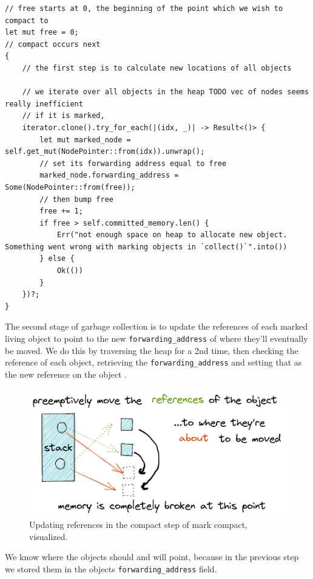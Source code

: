 \documentclass[index]{subfiles}
\begin{document}
\begin{verbatim}
// free starts at 0, the beginning of the point which we wish to compact to
let mut free = 0;
// compact occurs next
{
    // the first step is to calculate new locations of all objects

    // we iterate over all objects in the heap TODO vec of nodes seems really inefficient
    // if it is marked,
    iterator.clone().try_for_each(|(idx, _)| -> Result<()> {
        let mut marked_node = self.get_mut(NodePointer::from(idx)).unwrap();
        // set its forwarding address equal to free
        marked_node.forwarding_address = Some(NodePointer::from(free));
        // then bump free
        free += 1;
        if free > self.committed_memory.len() {
            Err("not enough space on heap to allocate new object. Something went wrong with marking objects in `collect()`".into())
        } else {
            Ok(())
        }
    })?;
}
\end{verbatim}

The second stage of garbage collection is to update the references of each marked living object to point to the new \verb+forwarding_address+ of where they'll eventually be moved. We do this by traversing the heap for a 2nd time, then checking the reference of each object, retrieving the \verb+forwarding_address+ and setting that as the new reference on the object \cites[Chapter 3]{gc_handbook}[Sec. 3.4]{redhat_openjdk}.

\begin{figure}[H]
    \centering
    \includegraphics[scale=0.3]{pics/update-references.png}
    \caption{Updating references in the compact step of mark compact, visualized.}
\end{figure}

We know where the objects should and will point, because in the previous step we stored them in the objects \verb+forwarding_address+ field.
\end{document}
